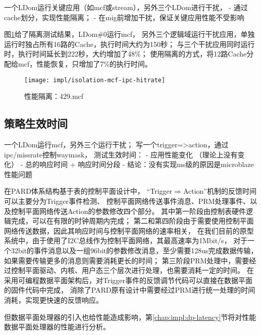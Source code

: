 一个LDom运行关键应用（如mcf或stream），另外三个LDom进行干扰，
 - 通过cache划分，实现性能隔离；
 - 在mig前增加干扰，保证关键应用性能不受影响

图\ref{fig:isolation-mcf-ipc-hitrate}给了隔离测试结果，LDom\#0运行mcf，
另外三个逻辑域运行干扰应用，单独运行时独占所有16路的Cache，执行时间大约为150秒；
与三个干扰应用同时运行时，执行时间延长到222秒，大约增加了48\%；
使用隔离的方式，将12路Cache分配给mcf，性能恢复，只增加了7\%的执行时间。

\begin{figure}[tb]
  \centering
  \texttt{[image: impl/isolation-mcf-ipc-hitrate]}
  \caption{性能隔离：429.mcf}
  \label{fig:isolation-mcf-ipc-hitrate}
\end{figure}


\subsection{策略生效时间}
\label{chap:impl:trigger-latency}

一个LDom运行mcf，另外三个运行干扰；
写一个trigger=>action，通过ipc/missrate控制waymask，
测试生效时间：
 - 应用性能变化 （理论上没有变化）
 - 总的响应时间 + 响应时间分段
 - 结论：没有实现ms级的原因是microblaze性能问题

在PARD体系结构基于表的控制平面设计中，
``Trigger$\Rightarrow$Action''机制的反馈时间可以主要分为Trigger事件检测、
控制平面网络传送事件消息、PRM处理事件、以及控制平面网络传送Action的参数修改四个部分。
其中第一阶段由控制表硬件逻辑完成，可以在有限的时钟周期内完成；
第二和第四阶段由于需要使用控制平面网络传送数据，因此其响应时间与控制平面网络的速率相关，
在我们目前的原型系统中，由于使用了I2C总线作为控制平面网络，其最高速率为1Mbit/s，
对于一个32bit的事件消息以及一组96bit的参数修改消息，至少需要128us完成数据传输，
如果需要传输更多的消息则需要消耗更长的时间；
第三阶段PRM处理中，需要经过控制平面驱动、内核、用户态三个层次进行处理，也需要消耗一定的时间。
在采用可编程数据平面架构后，对Trigger事件的反馈调节代码可以直接在数据平面的固件代码中完成，
消除了PARD原有设计中需要经过PRM进行统一处理的时间消耗，实现更快速的反馈响应。

但数据平面处理器的引入也给性能造成影响，第\ref{chap:impl:dp-latency}节将对性能数据平面处理器的性能进行分析。


%

